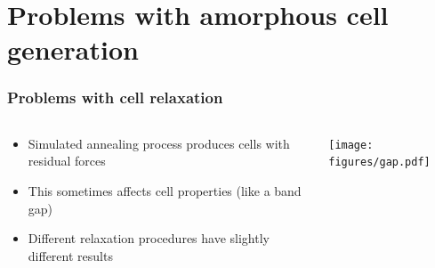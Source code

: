 \documentclass{beamer}
\begin{document}
\section{Problems with amorphous cell generation}
\begin{frame}
    \frametitle{Problems with cell relaxation}
	\begin{columns}
	\begin{column}{0.4\linewidth}
		\begin{itemize}
			\item Simulated annealing process produces cells with residual forces 
			\item This sometimes affects cell properties (like a band gap)
			\item Different relaxation procedures have slightly different results
		\end{itemize}
	\end{column}
	\begin{column}{0.6\linewidth}
		\texttt{[image: figures/gap.pdf]}
	\end{column}
	\end{columns}

\end{frame}
\end{document}
